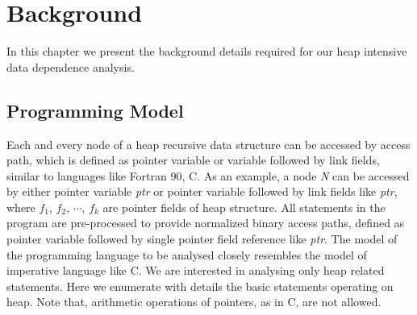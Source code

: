 \chapter{Background}
\label{ch:back}
In this chapter we present the background details required for our heap intensive data dependence analysis.
\section{Programming Model}
Each and every node of a heap recursive data structure can be 
accessed by access path, which is defined as pointer variable or variable 
followed by link fields, similar to languages like Fortran 90, C. As an example, 
a node \emph{N} can be accessed by either pointer variable \emph{ptr} or pointer variable  
followed by link fields like \emph{ptr}, 
where $f_1$, $f_2$, $\cdots$, $f_k$ are pointer fields of heap structure. All statements 
in the program are pre-processed to provide normalized binary access paths, 
defined as pointer variable followed by single pointer field reference like 
\emph{ptr}. The model of the programming language to be analysed 
closely resembles the model of imperative language like C. We are interested in 
analysing only heap related statements. Here we enumerate with details the basic statements 
operating on heap. Note that,  
arithmetic operations of pointers, as in C, are not allowed.
